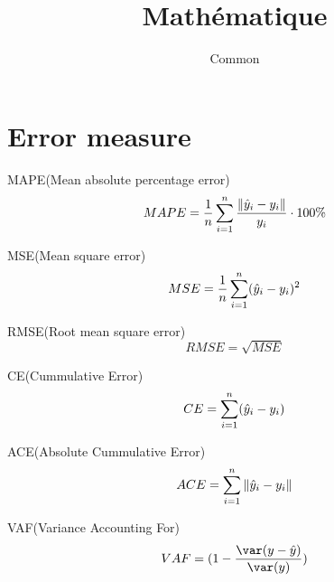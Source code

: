 \documentclass{article}
\begin{document}
\title{Math\'ematique}
\author{Common}
\maketitle
\tableofcontents
\newpage
\section{Error measure}
MAPE(Mean absolute percentage error)
$$ MAPE = \dfrac{1}{n} \sum_{i=1}^n \dfrac{\left\Vert \hat{y}_i - y_i\right\Vert}{y_i} \cdot 100\%$$

MSE(Mean square error)
$$MSE = \dfrac{1}{n} \sum_{i=1}^n (\hat{y}_i - y_i)^2$$

RMSE(Root mean square error)
$$RMSE  = \sqrt{MSE}$$

CE(Cummulative Error)
$$CE = \sum_{i=1}^n (\hat{y}_i - y_i)$$

ACE(Absolute Cummulative Error)
$$ACE = \sum_{i=1}^n \left\Vert \hat{y}_i - y_i\right\Vert$$

VAF(Variance Accounting For)
$$VAF = (1 - \dfrac{\var(y - \estimate{y})}{\var(y)})$$
\end{document}
